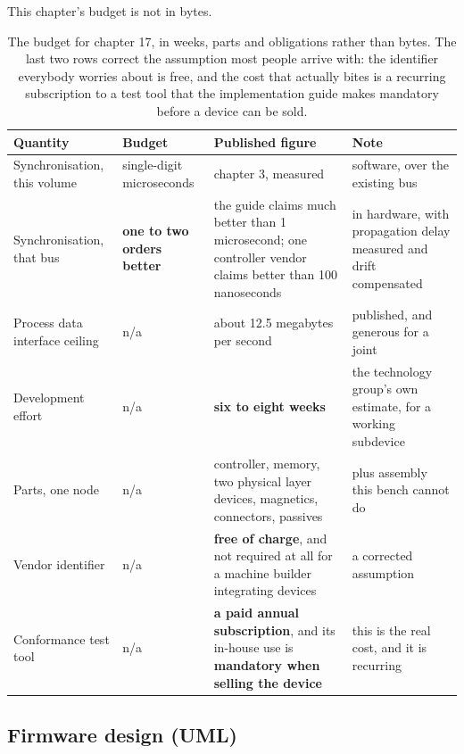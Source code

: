 This chapter's budget is not in bytes.

\begin{table}[H]\centering\small
\begin{tabular}{p{44mm}p{28mm}p{28mm}p{30mm}}
\toprule
Quantity & Budget & Published figure & Note \\
\midrule
Synchronisation, this volume & single-digit microseconds & chapter 3, measured & software, over the existing bus \\
Synchronisation, that bus & \textbf{one to two orders better} & the guide claims much better than 1 microsecond; one controller vendor claims better than 100 nanoseconds & in hardware, with propagation delay measured and drift compensated \\
Process data interface ceiling & n/a & about 12.5 megabytes per second & published, and generous for a joint \\
Development effort & n/a & \textbf{six to eight weeks} & the technology group's own estimate, for a working subdevice \\
Parts, one node & n/a & controller, memory, two physical layer devices, magnetics, connectors, passives & plus assembly this bench cannot do \\
Vendor identifier & n/a & \textbf{free of charge}, and not required at all for a machine builder integrating devices & a corrected assumption \\
Conformance test tool & n/a & \textbf{a paid annual subscription}, and its in-house use is \textbf{mandatory when selling the device} & this is the real cost, and it is recurring \\
\bottomrule
\end{tabular}
\caption{The budget for chapter 17, in weeks, parts and obligations rather than bytes. The last two rows correct the assumption most people arrive with: the identifier everybody worries about is free, and the cost that actually bites is a recurring subscription to a test tool that the implementation guide makes mandatory before a device can be sold.}
\end{table}

\subsection*{Firmware design (UML)}


